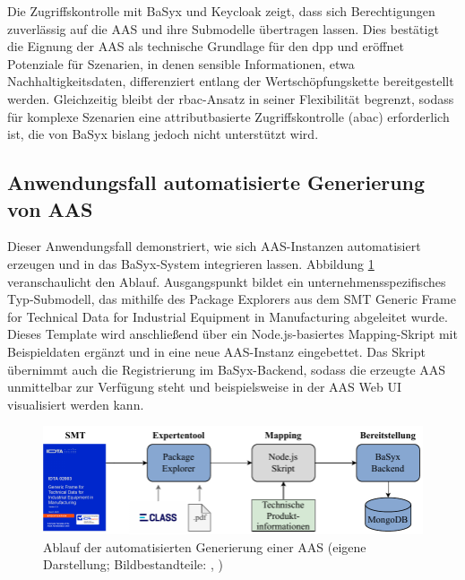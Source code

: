 Die Zugriffskontrolle mit BaSyx und Keycloak zeigt, dass sich Berechtigungen zuverlässig auf die AAS und ihre Submodelle übertragen lassen. 
Dies bestätigt die Eignung der AAS als technische Grundlage für den \acs{dpp} und eröffnet Potenziale für Szenarien, in denen sensible Informationen, etwa Nachhaltigkeitsdaten, differenziert entlang der Wertschöpfungskette bereitgestellt werden. 
Gleichzeitig bleibt der \acs{rbac}-Ansatz in seiner Flexibilität begrenzt, sodass für komplexe Szenarien eine attributbasierte Zugriffskontrolle (\acs{abac}) erforderlich ist, die von BaSyx bislang jedoch nicht unterstützt wird.

\newpage
\subsection{Anwendungsfall automatisierte Generierung von AAS}
Dieser Anwendungsfall demonstriert, wie sich AAS-Instanzen automatisiert erzeugen und in das BaSyx-System integrieren lassen.
Abbildung \ref{fig:AutomatisierteGenerierungAblauf} veranschaulicht den Ablauf.
Ausgangspunkt bildet ein unternehmensspezifisches Typ-Submodell, das mithilfe des Package Explorers aus dem SMT Generic Frame for Technical Data for Industrial Equipment in Manufacturing \cite{SpezifikaitonTechnischeDaten} abgeleitet wurde.
Dieses Template wird anschließend über ein Node.js-basiertes Mapping-Skript mit Beispieldaten ergänzt und in eine neue AAS-Instanz eingebettet.
Das Skript übernimmt auch die Registrierung im BaSyx-Backend, sodass die erzeugte AAS unmittelbar zur Verfügung steht und beispielsweise in der AAS Web UI visualisiert werden kann.

\begin{figure}[htbp]
    \centering
        \includegraphics{Bilder/ErgebnisseAutomatisierteGenerierung/ARchitektur.pdf}
    \caption[Ablauf der automatisierten Generierung einer AAS]{Ablauf der automatisierten Generierung einer AAS (eigene Darstellung; Bildbestandteile: \cite{SpezifikaitonTechnischeDaten}, \cite{ECLASSLogo} )}
    \label{fig:AutomatisierteGenerierungAblauf}
\end{figure}

